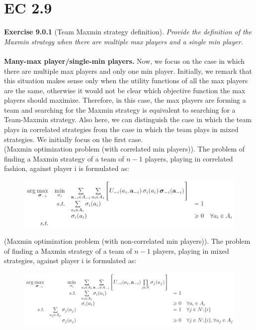\section{EC 2.9}

\textbf{Exercise 9.0.1} (Team Maxmin strategy definition). \textit{Provide the definition of the Maxmin strategy when there are multiple max players and a single min player.}\\\\
\textbf{Many-max player/single-min players.} Now, we focus on the case in which there are multiple max players and only one min player. Initially, we remark that this situation makes sense only when the utility functions of all the max players are the same, otherwise it would not be clear which objective function the max players should maximize. Therefore, in this case, the max players are forming a team and searching for the Maxmin strategy is equivalent to searching for a Team-Maxmin strategy. Also here, we can distinguish the case in which the team plays in correlated strategies from the case in which the team plays in mixed strategies. We initially focus on the first case.\\
(Maxmin optimization problem (with correlated min players)). The problem of finding a Maxmin strategy of a team of $n-1$ players, playing in correlated fashion, against player i is formulated as:
\begin{figure}[H]
\centering
\includegraphics[width=\textwidth]{images/img_2_9_01.png}
\end{figure}
\noindent
(Maxmin optimization problem (with non-correlated min players)). The problem of finding a
Maxmin strategy of a team of $n-1$ players, playing in mixed strategies, against player i is formulated as:
\begin{figure}[H]
\centering
\includegraphics[width=\textwidth]{images/img_2_9_02.png}
\end{figure}
